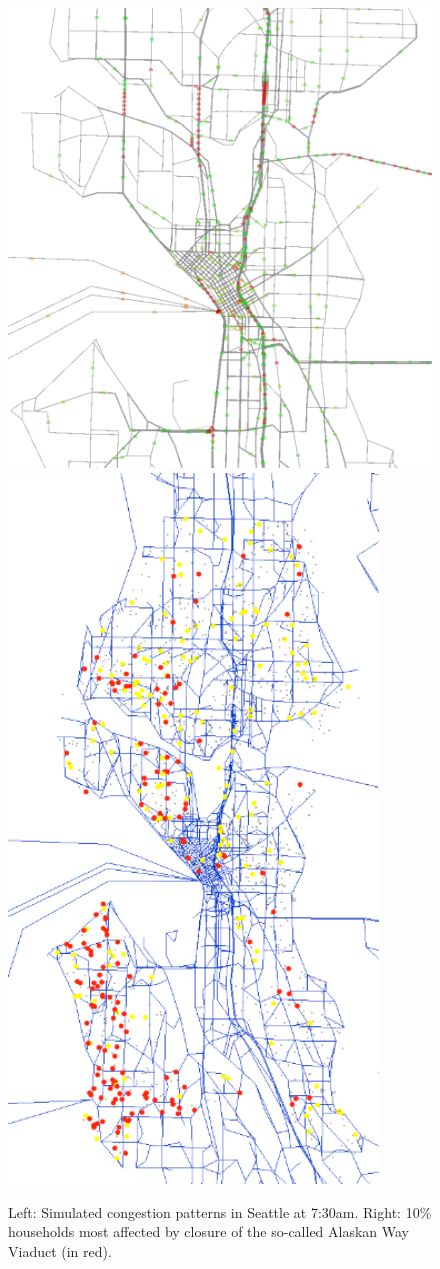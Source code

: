 \begin{figure}[!t!]
\centerline{%
\includegraphics[height=0.8\hsize,trim=0 0 0 0,clip]{using/figures/seattle-snapshot-7h30.pdf}
%
\includegraphics[height=0.8\hsize,trim=0 0 0 0,clip]{using/figures/seattle-top-10pct-0it.pdf}
}
\caption{Left: Simulated congestion patterns in Seattle at 7:30am.  Right: 10\% households most affected by closure of the so-called Alaskan Way Viaduct (in red).}
\label{fig:seattle-snapsho}
\end{figure}



